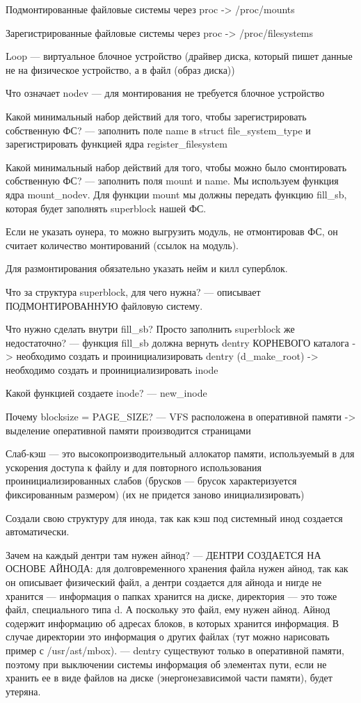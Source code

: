 Подмонтированные файловые системы через proc -> /proc/mounts

Зарегистрированные файловые системы через proc -> /proc/filesystems

Loop --- виртуальное блочное устройство (драйвер диска, который пишет данные не на физическое устройство, а в файл (образ диска))

Что означает nodev --- для монтирования не требуется блочное устройство

Какой минимальный набор действий для того, чтобы зарегистрировать собственную ФС? --- заполнить поле name в struct file\_system\_type и зарегистрировать функцией ядра register\_filesystem
    
Какой минимальный набор действий для того, чтобы можно было смонтировать
   собственную ФС? --- заполнить поля mount и name. Мы используем функция ядра mount\_nodev. Для функции mount мы должны передать функцию fill\_sb, которая будет заполнять superblock нашей ФС.
   
Если не указать оунера, то можно выгрузить модуль, не отмонтировав ФС, он считает количество монтирований (ссылок на модуль).

Для размонтирования обязательно указать нейм и килл суперблок.
   
Что за структура superblock, для чего нужна? --- описывает ПОДМОНТИРОВАННУЮ файловую систему.

Что нужно сделать внутри fill\_sb? Просто заполнить superblock же недостаточно? --- функция fill\_sb должна вернуть dentry КОРНЕВОГО каталога -> необходимо создать и проинициализировать dentry (d\_make\_root) -> необходимо создать и проинициализировать inode

Какой функцией создаете inode? --- new\_inode

Почему blocksize = PAGE\_SIZE? --- VFS расположена в оперативной памяти -> выделение оперативной памяти производится страницами

Слаб-кэш --- это высокопроизводительный аллокатор памяти, используемый в для ускорения доступа к файлу и для повторного использования проинициализированных слабов (брусков --- брусок характеризуется фиксированным размером) (их не придется заново инициализировать)

Создали свою структуру для инода, так как кэш под системный инод создается автоматически.
 
Зачем на каждый дентри там нужен айнод? --- ДЕНТРИ СОЗДАЕТСЯ НА ОСНОВЕ АЙНОДА: для долговременного хранения файла нужен айнод, так как он описывает физический файл, а дентри создается для айнода и нигде не хранится --- информация о папках хранится на диске, директория — это тоже файл, специального типа d. А поскольку это файл, ему нужен айнод. Айнод содержит информацию об адресах блоков, в которых хранится информация. В случае директории это информация о других файлах (тут можно нарисовать пример с /usr/ast/mbox). --- dentry существуют только в оперативной памяти, поэтому при выключении системы информация об элементах пути, если не хранить ее в виде файлов на диске (энергонезависимой части памяти), будет утеряна.

